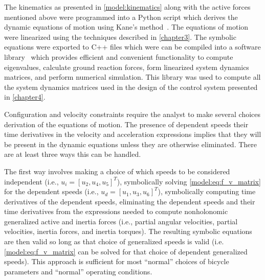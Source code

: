 The kinematics as presented in \autoref{model:kinematics} along with the active
forces mentioned above were programmed into a Python script which derives the
dynamic equations of motion using Kane's method~\cite{Kane1985}. The equations
of motion were linearized using the techniques described in \autoref{chapter3}.
The symbolic equations were exported to C++ files which were can be compiled
into a software library~\cite{libbicycle} which provides efficient and
convenient functionality to compute eigenvalues, calculate ground reaction
forces, form linearized system dynamics matrices, and perform numerical
simulation. This library was used to compute all the system dynamics matrices
used in the design of the control system presented in \autoref{chapter4}.

Configuration and velocity constraints require the analyst to make several
choices derivation of the equations of motion. The presence of dependent speeds
their time derivatives in the velocity and acceleration expressions implies
that they will be present in the dynamic equations unless they are otherwise
eliminated. There are at least three ways this can be handled.

The first way involves making a choice of which speeds to be considered
independent (i.e., $u_i=[u_2, u_4, u_5]^T$), symbolically solving
\autoref{model:eq:f_v_matrix} for the dependent speeds (i.e., $u_d = [u_1, u_3,
u_6]^T$), symbolically computing time derivatives of the dependent speeds,
eliminating the dependent speeds and their time derivatives from the
expressions needed to compute nonholonomic generalized active and inertia
forces (i.e., partial angular velocities, partial velocities, inertia forces,
and inertia torques). The resulting symbolic equations are then valid so long
as that choice of generalized speeds is valid (i.e.
\autoref{model:eq:f_v_matrix} can be solved for that choice of dependent
generalized speeds). This approach is sufficient for most ``normal'' choices of
bicycle parameters and ``normal'' operating conditions.

